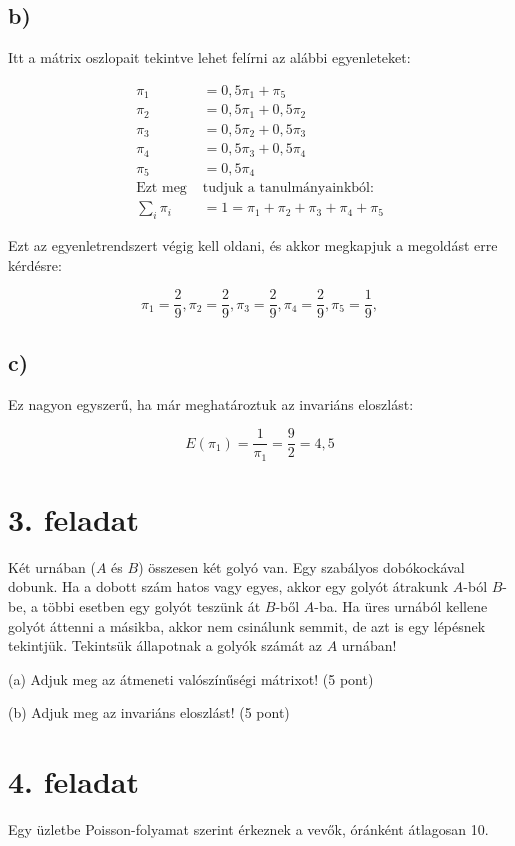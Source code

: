 \documentclass[a4paper,12pt]{article}   		%
\begin{document}
\subsection*{b)}
Itt a mátrix oszlopait tekintve lehet felírni az alábbi egyenleteket:

\begin{align*}
\pi_1 &= 0,5 \pi_1 + \pi_5 \\
\pi_2 &= 0,5 \pi_1 + 0,5 \pi_2 \\
\pi_3 &= 0,5 \pi_2 + 0,5 \pi_3 \\
\pi_4 &= 0,5 \pi_3 + 0,5 \pi_4 \\
\pi_5 &= 0,5 \pi_4 \\
\text{Ezt meg } &\text{tudjuk a tanulmányainkból:} \\
\sum_{i} \pi_i &= 1 = \pi_1 + \pi_2 + \pi_3 + \pi_4 + \pi_5
\end{align*}

Ezt az egyenletrendszert végig kell oldani, és akkor megkapjuk a
megoldást erre kérdésre:

\[
\pi_1 = \frac{2}{9},
\pi_2 = \frac{2}{9},
\pi_3 = \frac{2}{9},
\pi_4 = \frac{2}{9},
\pi_5 = \frac{1}{9},
\]

\subsection*{c)}
Ez nagyon egyszerű, ha már meghatároztuk az invariáns eloszlást:

\[
E(\pi_1) = \frac{1}{\pi_1} = \frac{9}{2} = 4,5
\]

\section*{3. feladat}
Két urnában ($A$ és $B$) összesen két golyó van. Egy szabályos 
dobókockával dobunk. Ha a dobott szám hatos vagy egyes, akkor egy
golyót átrakunk $A$-ból $B$-be, a többi esetben egy golyót teszünk
át $B$-ből $A$-ba. Ha üres urnából kellene golyót áttenni a másikba,
akkor nem csinálunk semmit, de azt is egy lépésnek tekintjük.
Tekintsük állapotnak a golyók számát az $A$ urnában!

(a) Adjuk meg az átmeneti valószínűségi mátrixot! (5 pont)

(b) Adjuk meg az invariáns eloszlást! (5 pont)

\section*{4. feladat}
Egy üzletbe Poisson-folyamat szerint érkeznek a vevők, óránként 
átlagosan 10.
\end{document}
